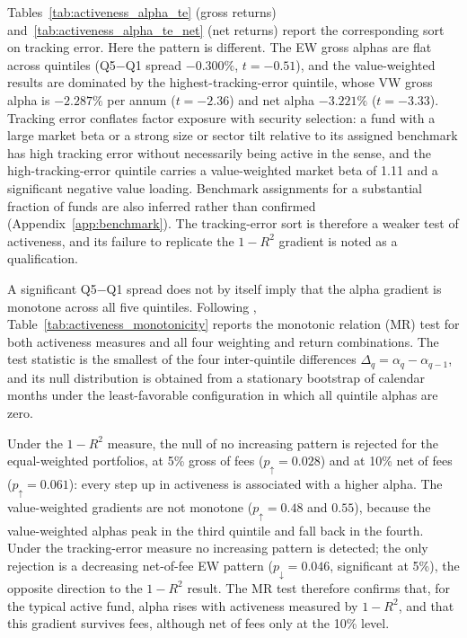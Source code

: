 \documentclass[12pt, oneside]{report}
\begin{document}
Tables~\ref{tab:activeness_alpha_te} (gross returns) and~\ref{tab:activeness_alpha_te_net} (net returns) report the corresponding sort on
tracking error. Here the pattern is different. The EW gross alphas are
flat across quintiles (Q5$-$Q1 spread $-0.300\%$, $t = -0.51$), and the
value-weighted results are dominated by the highest-tracking-error
quintile, whose VW gross alpha is $-2.287\%$ per annum ($t = -2.36$) and
net alpha $-3.221\%$ ($t = -3.33$). Tracking error conflates factor
exposure with security selection: a fund with a large market beta or a
strong size or sector tilt relative to its assigned benchmark has high
tracking error without necessarily being active in the
\textcite{AmihudGoyenko2013} sense, and the high-tracking-error quintile
carries a value-weighted market beta of 1.11 and a significant negative
value loading.
Benchmark assignments for a substantial fraction of funds are also
inferred rather than confirmed (Appendix~\ref{app:benchmark}). The
tracking-error sort is therefore a weaker test of activeness, and its
failure to replicate the $1-R^2$ gradient is noted as a qualification.



A significant Q5$-$Q1 spread does not by itself imply that the alpha
gradient is monotone across all five quintiles. Following
\textcite{PattonTimmermann2010}, Table~\ref{tab:activeness_monotonicity}
reports the monotonic relation (MR) test for both activeness measures and
all four weighting and return combinations. The test statistic is the
smallest of the four inter-quintile differences
$\Delta_q = \alpha_q - \alpha_{q-1}$, and its null distribution is
obtained from a stationary bootstrap of calendar months under the
least-favorable configuration in which all quintile alphas are zero.



Under the $1-R^2$ measure, the null of no increasing pattern is rejected
for the equal-weighted portfolios, at 5\% gross of fees
($p_\uparrow = 0.028$) and at 10\% net of fees ($p_\uparrow = 0.061$):
every step up in activeness is associated with a higher alpha. The value-weighted gradients are not
monotone ($p_\uparrow = 0.48$ and $0.55$), because the value-weighted
alphas peak in the third quintile and fall back in the fourth. Under the tracking-error measure no
increasing pattern is detected; the only rejection is a decreasing
net-of-fee EW pattern ($p_\downarrow = 0.046$, significant at 5\%), the
opposite direction to the $1-R^2$ result. The MR
test therefore confirms that, for the typical active fund, alpha rises
with activeness measured by $1-R^2$, and that this gradient survives
fees, although net of fees only at the 10\% level.
\end{document}
